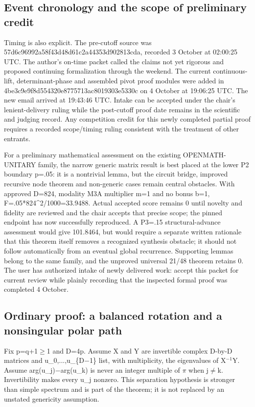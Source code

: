 \documentclass[11pt,a4paper]{article}
\begin{document}
\subsection{Event chronology and the scope of preliminary credit}
Timing is also explicit. The pre-cutoff source was 57d6c96992a58f43d48d61c2a44353d902813cda, recorded 3 October at 02:00:25 UTC. The author's on-time packet called the claims not yet rigorous and proposed continuing formalization through the weekend. The current continuous-lift, determinant-phase and assembled pivot proof modules were added in 4be3c9e9f8d554320e8775713ac8019303e5330c on 4 October at 19:06:25 UTC. The new email arrived at 19:43:46 UTC. Intake can be accepted under the chair's lenient-delivery ruling while the post-cutoff proof date remains in the scientific and judging record. Any competition credit for this newly completed partial proof requires a recorded scope/timing ruling consistent with the treatment of other entrants.

For a preliminary mathematical assessment on the existing OPENMATH-UNITARY family, the narrow generic matrix result is best placed at the lower P2 boundary p=.05: it is a nontrivial lemma, but the circuit bridge, improved recursive node theorem and non-generic cases remain central obstacles. With approved D=824, modality M3A multiplier m=1 and no bonus b=1, F=.05*824\textasciicircum{}2/1000=33.9488. Actual accepted score remains 0 until novelty and fidelity are reviewed and the chair accepts that precise scope; the pinned endpoint has now successfully reproduced. A P3=.15 structural-advance assessment would give 101.8464, but would require a separate written rationale that this theorem itself removes a recognized synthesis obstacle; it should not follow automatically from an eventual global recurrence. Supporting lemmas belong to the same family, and the unproved universal 21/48 theorem retains 0. The user has authorized intake of newly delivered work: accept this packet for current review while plainly recording that the inspected formal proof was completed 4 October.

\subsection{Ordinary proof: a balanced rotation and a nonsingular polar path}
Fix p=q+1\ensuremath{\geq}1 and D=4p. Assume X and Y are invertible complex D-by-D matrices and u\_0,...,u\_\{D\ensuremath{-}1\} list, with multiplicity, the eigenvalues of X\ensuremath{^{-1}}Y. Assume arg(u\_j)\ensuremath{-}arg(u\_k) is never an integer multiple of \ensuremath{\pi} when j\ensuremath{\neq}k. Invertibility makes every u\_j nonzero. This separation hypothesis is stronger than simple spectrum and is part of the theorem; it is not replaced by an unstated genericity assumption.
\end{document}
